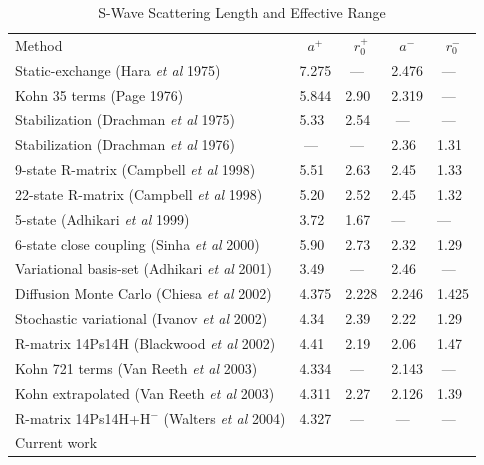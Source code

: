 \documentclass[preprint,showpacs,preprintnumbers,amsmath,amssymb]{revtex4}
\begin{document}
\begin{table}
\begin{center}
\begin{ruledtabular}
\begin{tabular}{l l l l l}
Method & \multicolumn{1}{c}{$a^+$} & \multicolumn{1}{c}{$r_0^+$} & \multicolumn{1}{c}{$a^-$} & \multicolumn{1}{c}{$r_0^-$}\\
\colrule
Static-exchange (Hara \emph{et al} 1975) \cite{Hara1975} & 7.275 & \,\,--- & 2.476 & \,\,--- \\
Kohn 35 terms (Page 1976) \cite{Page1976} & 5.844 & 2.90 & 2.319 & \,\,--- \\
Stabilization (Drachman \emph{et al} 1975) \cite{Drachman1975} & 5.33 & 2.54 & \,\,--- & \,\,--- \\
Stabilization (Drachman \emph{et al} 1976) \cite{Drachman1976} & \,\,--- & \,\,--- & 2.36 & 1.31 \\
9-state R-matrix (Campbell \emph{et al} 1998) \cite{Campbell1998} & 5.51 & 2.63 & 2.45 & 1.33 \\
22-state R-matrix (Campbell \emph{et al} 1998) \cite{Campbell1998} & 5.20 & 2.52 & 2.45 & 1.32 \\
5-state (Adhikari \emph{et al} 1999) \cite{Adhikari1999} & 3.72 & 1.67 & --- & --- \\
6-state close coupling (Sinha \emph{et al} 2000) \cite{Sinha2000} & 5.90 & 2.73 & 2.32 & 1.29 \\
Variational basis-set (Adhikari \emph{et al} 2001) \cite{Adhikari2001b} & 3.49 & \,\,--- & 2.46 & \,\,--- \\
Diffusion Monte Carlo (Chiesa \emph{et al} 2002) \cite{Chiesa2002} & 4.375 & 2.228 & 2.246 & 1.425 \\
Stochastic variational (Ivanov \emph{et al} 2002) \cite{Ivanov2002} & 4.34 & 2.39 & 2.22 & 1.29 \\
R-matrix 14Ps14H (Blackwood \emph{et al} 2002) \cite{Blackwood2002} & 4.41 & 2.19 & 2.06 & 1.47 \\
Kohn 721 terms (Van Reeth \emph{et al} 2003) \cite{VanReeth2003} & 4.334 & \,\,--- & 2.143 & \,\,--- \\
Kohn extrapolated (Van Reeth \emph{et al} 2003) \cite{VanReeth2003} & 4.311 & 2.27 & 2.126 & 1.39 \\
R-matrix 14Ps14H+H$^-$ (Walters \emph{et al} 2004) \cite{Blackwood2002} & 4.327 & \,\,--- & \,\,--- & \,\,--- \\
Current work & & & & \\
\end{tabular}
\end{ruledtabular}
\caption{S-Wave Scattering Length and Effective Range}
\label{tab:SWaveScatLenOther}
\end{center}
\end{table}
\end{document}
